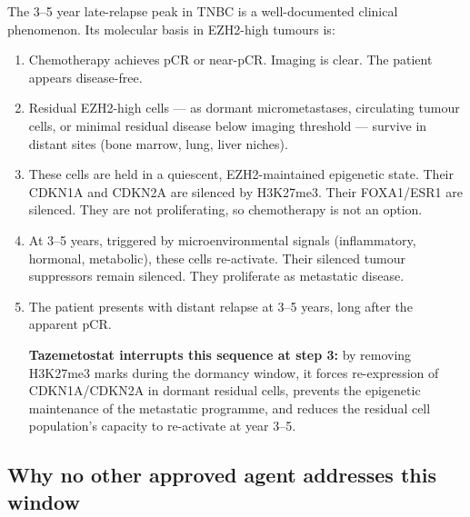 \documentclass[12pt, a4paper]{article}
\begin{document}
The 3--5 year late-relapse peak in TNBC is a
well-documented clinical phenomenon. Its molecular
basis in EZH2-high tumours is:

\begin{enumerate}
  \item Chemotherapy achieves pCR or near-pCR.
        Imaging is clear. The patient appears
        disease-free.

  \item Residual EZH2-high cells --- as dormant
        micrometastases, circulating tumour cells,
        or minimal residual disease below imaging
        threshold --- survive in distant sites
        (bone marrow, lung, liver niches).

  \item These cells are held in a quiescent,
        EZH2-maintained epigenetic state. Their
        CDKN1A and CDKN2A are silenced by H3K27me3.
        Their FOXA1/ESR1 are silenced. They are
        not proliferating, so chemotherapy is
        not an option.

  \item At 3--5 years, triggered by microenvironmental
        signals (inflammatory, hormonal, metabolic),
        these cells re-activate. Their silenced tumour
        suppressors remain silenced. They proliferate
        as metastatic disease.

  \item The patient presents with distant relapse
        at 3--5 years, long after the apparent pCR.

  \textbf{Tazemetostat interrupts this sequence
  at step 3:} by removing H3K27me3 marks during
  the dormancy window, it forces re-expression of
  CDKN1A/CDKN2A in dormant residual cells, prevents
  the epigenetic maintenance of the metastatic
  programme, and reduces the residual cell
  population's capacity to re-activate at year 3--5.
\end{enumerate}

\subsection{Why no other approved agent addresses
this window}
\end{document}

